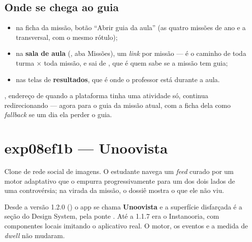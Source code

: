 \subsection{Onde se chega ao guia}

\begin{itemize}
  \item na ficha da missão, botão \enquote{Abrir guia da aula} (as quatro
    missões de ano e a transversal, com o mesmo rótulo);
  \item na \textbf{sala de aula} (, aba Missões),
    um \emph{link} por missão --- é o caminho de toda turma × toda missão, e
    sai de , que é quem sabe se a missão tem guia;
  \item nas telas de \textbf{resultados}, que é onde o professor está durante a
    aula.
\end{itemize}

\begin{nota}
, endereço de quando a plataforma tinha uma atividade só,
continua redirecionando --- agora para o guia da missão atual, com a ficha dela
como \emph{fallback} se um dia ela perder o guia.
\end{nota}

\section{exp08ef1b --- Unoovista}

Clone de rede social de imagens. O estudante navega um \emph{feed} curado por um
motor adaptativo que o empurra progressivamente para um dos dois lados de uma
controvérsia; na virada da missão, o dossiê mostra o que ele não viu.

\begin{nota}
Desde a versão 1.2.0 () o app se chama \textbf{Unoovista} e a
superfície disfarçada é a seção  do Design System, pela ponte
. Até a 1.1.7 era o Instanooria, com componentes
locais imitando o aplicativo real. O motor, os eventos e a medida de
\emph{dwell} não mudaram.
\end{nota}

